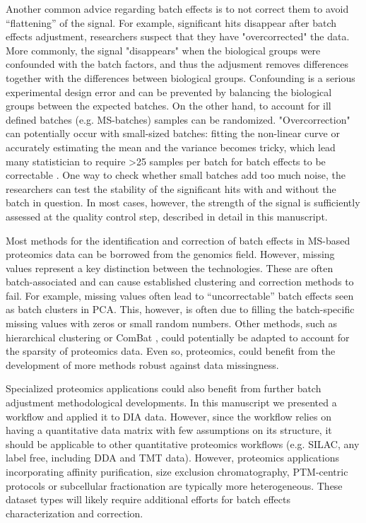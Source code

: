 \documentclass[num-refs]{wiley-article}
\begin{document}
Another common advice regarding batch effects is to not correct them to avoid “flattening” of the signal. For example, significant hits disappear after batch effects adjustment, researchers suspect that they have "overcorrected" the data. More commonly, the signal "disappears" when the biological groups were confounded with the batch factors, and thus the adjusment removes differences together with the differences between biological groups. Confounding is a serious experimental design error and can be prevented by balancing the biological groups between the expected batches. On the other hand, to account for ill defined batches (e.g. MS-batches) samples can be randomized. "Overcorrection" can potentially occur with small-sized batches: fitting the non-linear curve or accurately estimating the mean and the variance becomes tricky, which lead many statistician to require >25 samples per batch for batch effects to be correctable \cite{Benito2004, Alter2000}. One way to check whether small batches add too much noise, the researchers can test the stability of the significant hits with and without the batch in question. In most cases, however, the strength of the signal is sufficiently assessed at the quality control step, described in detail in this manuscript.

Most methods for the identification and correction of batch effects in MS-based proteomics data can be borrowed from the genomics field. However, missing values represent a key distinction between the technologies. These are often batch-associated and can cause established clustering and correction methods to fail. For example, missing values often lead to “uncorrectable” batch effects seen as batch clusters in PCA. This, however, is often due to filling the batch-specific missing values with zeros or small random numbers. Other methods, such as hierarchical clustering or ComBat \cite{Johnston2005a}, could potentially be adapted to account for the sparsity of proteomics data. Even so, proteomics, could benefit from the development of more methods robust against data missingness.

Specialized proteomics applications could also benefit from further batch adjustment methodological developments. In this manuscript we presented a workflow and applied it to DIA data. However, since the workflow relies on having a quantitative data matrix with few assumptions on its structure, it should be applicable to other quantitative proteomics workflows (e.g. SILAC, any label free, including DDA and TMT data). However, proteomics applications incorporating affinity purification, size exclusion chromatography, PTM-centric protocols or subcellular fractionation are typically more heterogeneous. These dataset types will likely require additional efforts for batch effects characterization and correction.
\end{document}

